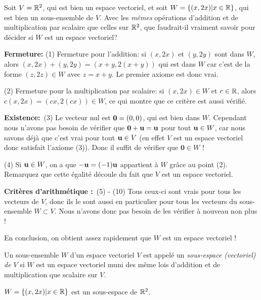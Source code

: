 \begin{myexample}
Soit $V = \mathbb{R}^2$, qui est bien un espace vectoriel, et
soit $W = \{(x,2x) | x\in \mathbb{R}\}$, qui est bien un sous-ensemble de $V$. Avec les \emph{mêmes} opérations
d'addition et de multiplication par scalaire que celles sur  $\mathbb{R}^2$, que faudrait-il  vraiment savoir pour décider si  $W$ est
un espace vectoriel? 

{\textbf{Fermeture:}} (1) Fermeture pour l'addition: si $(x,2x)$ et
$(y,2y)$ sont dans $W$, alors $(x,2x) + (y,2y) = (x+y, 2(x+y))$ qui
est dans $W$ car c'est de la forme $(z,2z)\in W$ avec $z=x+y$.
Le premier axiome est donc vrai.

(2) Fermeture pour la multiplication par scalaire: si $(x,2x) \in W$ et
$c\in \mathbb{R}$, alors $c(x,2x) = (cx,2(cx))\in W$, ce qui montre que ce crit\`ere est aussi v\'erifi\'e.

{\textbf{Existence:}}~(3) Le vecteur nul est $\mathbf{0}=(0,0)$, qui est bien dans
$W$. Cependant nous n'avons pas besoin de vérifier que
$\mathbf 0 + \mathbf{u} = \mathbf{u}$ pour tout $\mathbf{u} \in W$, car nous
savons déjà que c'est vrai pour tout $\mathbf{u} \in V$
(en effet $V$ est un espace vectoriel donc satisfait l'axiome (3)).
Donc il suffit de v\'erifier que $\mathbf 0 \in W$ !

(4) Si $\mathbf{u} \in W$, on a que
$-\mathbf{u} = (-1)\mathbf{u}$ appartient à $W$ grâce au point (2). Remarquez que cette égalité découle du fait que $V$ est un espace vectoriel.

{\textbf{Crit\`eres d'arithm\'etique :}}~(5) - (10) Tous ceux-ci sont
vrais pour tous les vecteurs de $V$, donc ils le sont aussi en
particulier pour tous les vecteurs du sous-ensemble
$W \subset V$. Nous n'avons donc pas besoin de les vérifier à nouveau non plus !

En conclusion, on obtient assez rapidement que $W$ est un espace vectoriel !
\end{myexample}

\begin{definition}
Un sous-ensemble $W$ d'un espace vectoriel $V$ est appelé un \emph{sous-espace (vectoriel) de $V$} si $W$ est un espace vectoriel muni des même lois d'addition et de multiplication que scalaire sur $V$.
\end{definition}


\begin{myexample}
$W = \{ (x,2x) | x\in \mathbb{R}\}$ est un sous-espace de $\mathbb{R}^2$.

\end{myexample}


